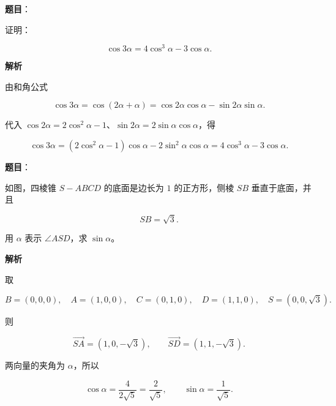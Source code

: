 \begin{answer}

\textbf{题目}：

证明：

\nopagebreak[4]
\[
\cos3\alpha=4\cos^3\alpha-3\cos\alpha.
\]

\textbf{解析}

由和角公式

\nopagebreak[4]
\[
\cos3\alpha=\cos(2\alpha+\alpha)
=\cos2\alpha\cos\alpha-\sin2\alpha\sin\alpha.
\]

代入 $\cos2\alpha=2\cos^2\alpha-1$、$\sin2\alpha=2\sin\alpha\cos\alpha$，得

\nopagebreak[4]
\[
\cos3\alpha
=(2\cos^2\alpha-1)\cos\alpha
-2\sin^2\alpha\cos\alpha
=4\cos^3\alpha-3\cos\alpha.
\]


\end{answer}
\begin{answer}

\textbf{题目}：

如图，四棱锥 $S-ABCD$ 的底面是边长为 $1$ 的正方形，侧棱 $SB$ 垂直于底面，并且

\nopagebreak[4]
\[
SB=\sqrt3.
\]

用 $\alpha$ 表示 $\angle ASD$，求 $\sin\alpha$。
\nopagebreak[4]
\begin{center}\end{center}
\nopagebreak[4]
\textbf{解析}

取

\nopagebreak[4]
\[
B=(0,0,0),\quad A=(1,0,0),\quad
C=(0,1,0),\quad D=(1,1,0),\quad
S=(0,0,\sqrt3).
\]

则

\nopagebreak[4]
\[
\overrightarrow{SA}=(1,0,-\sqrt3),\qquad
\overrightarrow{SD}=(1,1,-\sqrt3).
\]

两向量的夹角为 $\alpha$，所以

\nopagebreak[4]
\[
\cos\alpha=\frac{4}{2\sqrt5}=\frac2{\sqrt5},
\qquad
\sin\alpha=\frac1{\sqrt5}.
\]


\end{answer}
